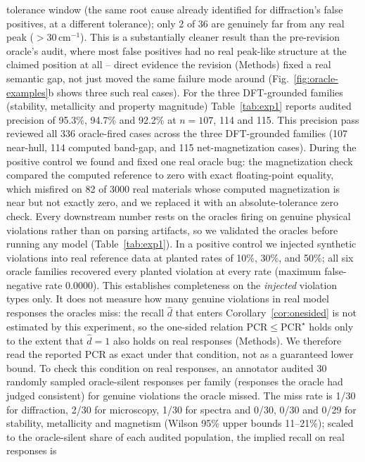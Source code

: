 \documentclass[pdflatex,sn-nature]{sn-jnl}
\newcommand{\rev}[1]{#1} %
\newcommand{\rev}[1]{{\color{blue}#1}} %
\providecommand{\DIFadd}[1]{{\protect\color{blue} \sf #1}} %
\providecommand{\DIFaddbegin}{} %
\providecommand{\DIFdelend}{} %
\providecommand{\DIFaddincludegraphics}[2][]{{\color{blue}\fbox{\DIFOincludegraphics[#1]{#2}}}} %
\DeclareRobustCommand{\DIFaddbegin}{\DIFOaddbegin \let\includegraphics\DIFaddincludegraphics} %
\DeclareRobustCommand{\DIFdelend}{\DIFOaddend \let\includegraphics\DIFOincludegraphics} %
\begin{document}
{tolerance window (the same root cause already identified for diffraction's false
positives, at a different tolerance); only 2 of 36 are genuinely far from any real peak
($>30\,\mathrm{cm}^{-1}$). This is a substantially cleaner result than the pre-revision
oracle's audit, where most false positives had no real peak-like structure at the claimed
position at all -- direct evidence the revision (Methods) fixed a real semantic gap, not
just moved the same failure mode around (Fig.~\ref{fig:oracle-examples}b shows three
such real cases). For the three DFT-grounded families (stability, metallicity and
property magnitude) Table~\ref{tab:exp1} reports audited precision of 95.3\%, 94.7\% and
92.2\% at $n=107$, 114 and 115. This precision pass reviewed all 336 oracle-fired cases across the three DFT-grounded families (107 near-hull, 114 computed band-gap, and 115 net-magnetization cases). During the positive control we found and fixed one real oracle bug: the magnetization check compared the computed reference to
zero with exact floating-point equality, which misfired on 82 of 3000 real materials whose computed magnetization is near but not exactly zero, and we replaced it with an absolute-tolerance zero check.
}\DIFdelend \DIFaddbegin \DIFadd{\rev{Every downstream number rests on the oracles firing on genuine physical violations
rather than on parsing artifacts, so we validated the oracles before running any model
(Table~\ref{tab:exp1}). In a positive control we injected synthetic violations into real
reference data at planted rates of 10\%, 30\%, and 50\%; all six oracle families recovered
every planted violation at every rate (maximum false-negative rate 0.0000). This establishes
completeness on the \emph{injected} violation types only. It does not measure how many genuine
violations in real model responses the oracles miss: the recall $\hat d$ that enters
Corollary~\ref{cor:onesided} is not estimated by this experiment, so the one-sided relation
$\mathrm{PCR}\le\mathrm{PCR}^\star$ holds only to the extent that $\hat d=1$ also holds on real
responses (Methods). We therefore read the reported PCR as exact under that condition, not as a
guaranteed lower bound. To check this condition on real responses, an annotator audited 30 randomly
sampled oracle-silent responses per family (responses the oracle had judged consistent) for genuine
violations the oracle missed. The miss rate is 1/30 for diffraction, 2/30 for microscopy, 1/30 for spectra
and 0/30, 0/30 and 0/29 for stability, metallicity and magnetism (Wilson 95\% upper bounds 11--21\%);
scaled to the oracle-silent share of each audited population, the implied recall on real responses is
}}
\end{document}
